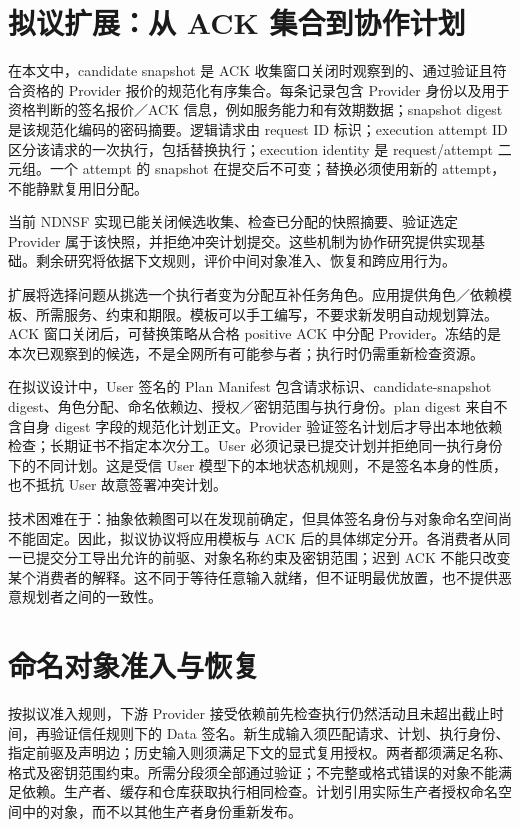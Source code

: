 


\section{拟议扩展：从 ACK 集合到协作计划}
在本文中，candidate snapshot 是 ACK 收集窗口关闭时观察到的、通过验证且符合资格的 Provider 报价的规范化有序集合。每条记录包含 Provider 身份以及用于资格判断的签名报价／ACK 信息，例如服务能力和有效期数据；snapshot digest 是该规范化编码的密码摘要。逻辑请求由 request ID 标识；execution attempt ID 区分该请求的一次执行，包括替换执行；execution identity 是 request/attempt 二元组。一个 attempt 的 snapshot 在提交后不可变；替换必须使用新的 attempt，不能静默复用旧分配。

当前 NDNSF 实现已能关闭候选收集、检查已分配的快照摘要、验证选定 Provider 属于该快照，并拒绝冲突计划提交。这些机制为协作研究提供实现基础。剩余研究将依据下文规则，评价中间对象准入、恢复和跨应用行为。

扩展将选择问题从挑选一个执行者变为分配互补任务角色。应用提供角色／依赖模板、所需服务、约束和期限。模板可以手工编写，不要求新发明自动规划算法。ACK 窗口关闭后，可替换策略从合格 positive ACK 中分配 Provider。冻结的是本次已观察到的候选，不是全网所有可能参与者；执行时仍需重新检查资源。

在拟议设计中，User 签名的 Plan Manifest 包含请求标识、candidate-snapshot digest、角色分配、命名依赖边、授权／密钥范围与执行身份。plan digest 来自不含自身 digest 字段的规范化计划正文。Provider 验证签名计划后才导出本地依赖检查；长期证书不指定本次分工。User 必须记录已提交计划并拒绝同一执行身份下的不同计划。这是受信 User 模型下的本地状态机规则，不是签名本身的性质，也不抵抗 User 故意签署冲突计划。

技术困难在于：抽象依赖图可以在发现前确定，但具体签名身份与对象命名空间尚不能固定。因此，拟议协议将应用模板与 ACK 后的具体绑定分开。各消费者从同一已提交分工导出允许的前驱、对象名称约束及密钥范围；迟到 ACK 不能只改变某个消费者的解释。这不同于等待任意输入就绪，但不证明最优放置，也不提供恶意规划者之间的一致性。

\section{命名对象准入与恢复}
按拟议准入规则，下游 Provider 接受依赖前先检查执行仍然活动且未超出截止时间，再验证信任规则下的 Data 签名。新生成输入须匹配请求、计划、执行身份、指定前驱及声明边；历史输入则须满足下文的显式复用授权。两者都须满足名称、格式及密钥范围约束。所需分段须全部通过验证；不完整或格式错误的对象不能满足依赖。生产者、缓存和仓库获取执行相同检查。计划引用实际生产者授权命名空间中的对象，而不以其他生产者身份重新发布。

